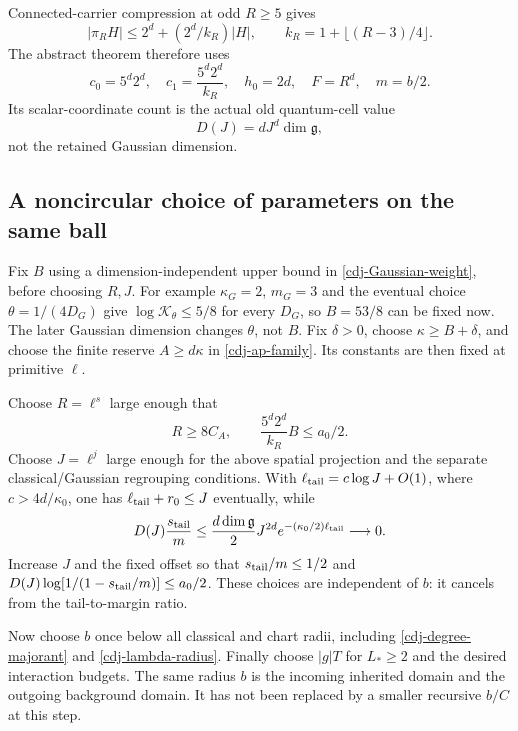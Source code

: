 \documentclass[11pt]{article}
\theoremstyle{remark}
\begin{document}
Connected-carrier compression at odd $R\ge5$ gives
\[
 |\pi_RH|\le2^d+(2^d/k_R)|H|,
 \qquad k_R=1+\lfloor(R-3)/4\rfloor.
\]
The abstract theorem therefore uses
\begin{equation}\label{cdj-actual-constants}
 c_0=5^d2^d,\quad c_1=\frac{5^d2^d}{k_R},
 \quad h_0=2d,\quad F=R^d,\quad m=b/2.
\end{equation}
Its scalar-coordinate count is the actual old quantum-cell
value
\begin{equation}\label{cdj-D}
 D(J)=dJ^d\dim\mathfrak g,
\end{equation}
not the retained Gaussian dimension.

\subsection{A noncircular choice of parameters on the same ball}
\label{cdj-parameters-section}

Fix $B$ using a dimension-independent upper bound in
\eqref{cdj-Gaussian-weight}, before choosing $R,J$.
For example $\kappa_G=2$, $m_G=3$ and the eventual choice
$\theta=1/(4D_G)$ give $\log\mathcal K_\theta\le5/8$
for every $D_G$, so $B=53/8$ can be fixed now.
The later Gaussian dimension changes $\theta$, not $B$.
Fix $\delta>0$, choose $\kappa\ge B+\delta$, and choose
the finite reserve $A\ge d\kappa$ in
\eqref{cdj-ap-family}. Its constants are then fixed
at primitive $\ell$.

Choose $R=\ell^s$ large enough that
\begin{equation}\label{cdj-R-choice}
 R\ge8C_A,\qquad
 \frac{5^d2^d}{k_R}B\le a_0/2.
\end{equation}
Choose $J=\ell^j$ large enough for the above spatial
projection and the separate classical/Gaussian regrouping
conditions. With
$\ell_{\rm tail}=c\log J+O(1)$, where $c>4d/\kappa_0$,
one has $\ell_{\rm tail}+r_0\le J$ eventually, while
\begin{equation}\label{cdj-dimension-tail}
 D(J)\frac{s_{\rm tail}}m
 \le\frac{d\dim\mathfrak g}{2}J^{2d}
          e^{-(\kappa_0/2)\ell_{\rm tail}}\longrightarrow0.
\end{equation}
Increase $J$ and the fixed offset so that
$s_{\rm tail}/m\le1/2$ and
$D(J)\log[1/(1-s_{\rm tail}/m)]\le a_0/2$.
These choices are independent of $b$: it cancels from
the tail-to-margin ratio.

Now choose $b$ once below all classical and chart radii,
including \eqref{cdj-degree-majorant} and
\eqref{cdj-lambda-radius}. Finally choose $|g|T$ for
$L_*\ge2$ and the desired interaction budgets.
The same radius $b$ is the incoming inherited domain
and the outgoing background domain. It has not been
replaced by a smaller recursive $b/C$ at this step.
\end{document}
